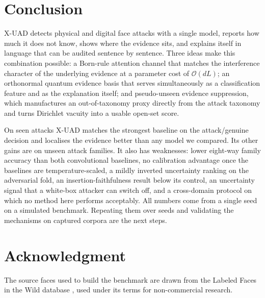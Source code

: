 \documentclass[conference]{IEEEtran}
\begin{document}
\section{Conclusion}
X-UAD detects physical and digital face attacks with a single model, reports how much
it does not know, shows where the evidence sits, and explains itself in language that
can be audited sentence by sentence. Three ideas make this combination possible: a
Born-rule attention channel that matches the interference character of the underlying
evidence at a parameter cost of $\mathcal{O}(dL)$; an orthonormal quantum evidence
basis that serves simultaneously as a classification feature and as the explanation
itself; and pseudo-unseen evidence suppression, which manufactures an out-of-taxonomy
proxy directly from the attack taxonomy and turns Dirichlet vacuity into a usable
open-set score.

On seen attacks X-UAD matches the strongest baseline on the attack/genuine decision
and localises the evidence better than any model we compared. Its other gains are on
unseen attack families. It also has weaknesses: lower eight-way family accuracy than
both convolutional baselines, no calibration advantage once the baselines are
temperature-scaled, a mildly inverted uncertainty ranking on the adversarial fold,
an insertion-faithfulness result below its control, an uncertainty signal that a
white-box attacker can switch off, and a cross-domain protocol on which no method
here performs acceptably. All numbers come from a single seed on a simulated
benchmark. Repeating them over seeds and validating the mechanisms on captured
corpora are the next steps.

\section*{Acknowledgment}
The source faces used to build the benchmark are drawn from the Labeled Faces in the
Wild database \cite{huang2007lfw}, used under its terms for non-commercial research.



\end{document}
